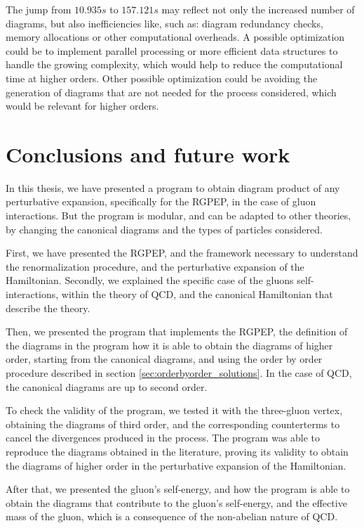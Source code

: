 \documentclass[11pt,a4paper,twoside,pdf]{article}
\numberwithin{equation}{section}
\begin{document}
The jump from $10.935 s$ to $157.121 s$ may reflect not only the increased number of diagrams, 
but also inefficiencies like, such as: diagram redundancy checks, memory allocations or 
other computational overheads. A possible optimization could be to implement 
parallel processing or more efficient data structures to handle the growing complexity, 
which would help to reduce the computational time at higher orders. Other possible
optimization could be avoiding the generation of diagrams that are not needed for the 
process considered, which would be relevant for higher orders.



\newpage

\section{Conclusions and future work} \label{sec:conclusions}

In this thesis, we have presented a program to obtain diagram product of any 
perturbative expansion, specifically for the RGPEP, in the case of gluon interactions.
But the program is modular, and can be adapted to other theories, by changing the
canonical diagrams and the types of particles considered. 

First, we have presented the RGPEP, and the framework necessary to understand the 
renormalization procedure, and the perturbative expansion of the Hamiltonian. Secondly, 
we explained the specific case of the gluons self-interactions, within the
theory of QCD, and the canonical Hamiltonian that describe the theory.

Then, we presented the program that implements the RGPEP, the definition of the diagrams 
in the program how it is able to obtain the diagrams of higher order, starting
from the canonical diagrams, and using the order by order procedure described in section
\ref{sec:orderbyorder_solutions}. In the case of QCD, the canonical diagrams are up to 
second order. 

To check the validity of the program, we tested it with the three-gluon vertex,
obtaining the diagrams of third order, and the corresponding counterterms to cancel
the divergences produced in the process. The program was able to reproduce the
diagrams obtained in the literature, proving its validity to obtain the diagrams of
higher order in the perturbative expansion of the Hamiltonian.

After that, we presented the gluon's self-energy, and how the program is able to
obtain the diagrams that contribute to the gluon's self-energy, and the effective mass
of the gluon, which is a consequence of the non-abelian nature of QCD.
\end{document}
